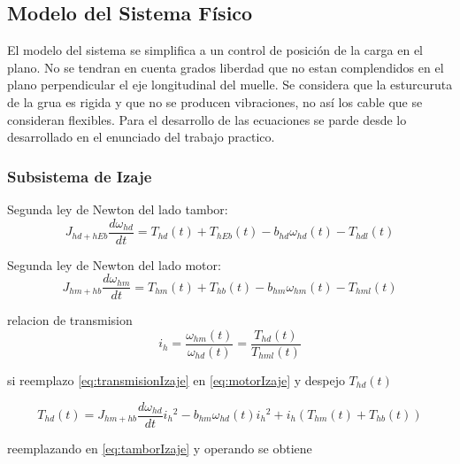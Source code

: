 \documentclass{article}
\begin{document}
    \subsection{Modelo del Sistema Físico} \label{sec:plantModel}

        El modelo del sistema se simplifica a un control de posición de la carga en el plano. No se tendran en cuenta grados liberdad que no estan complendidos en el plano perpendicular el eje longitudinal del muelle. Se considera que la esturcuruta de la grua es rigida y que no se producen vibraciones, no así los cable que se consideran flexibles.
        Para el desarrollo de las ecuaciones se parde desde lo desarrollado en el enunciado del trabajo practico.
        
        \subsubsection{Subsistema de Izaje}
            Segunda ley de Newton del lado tambor:
            \begin{equation} \label{eq:tamborIzaje}
                J_{hd+hEb} \frac{d \omega_{hd}}{dt} = T_{hd}(t) + T_{hEb}(t) - b_{hd} \omega_{hd}(t) - T_{hdl}(t)
            \end{equation}

            Segunda ley de Newton del lado motor:
            \begin{equation} \label{eq:motorIzaje}
                J_{hm+hb} \frac{d \omega_{hm}}{dt} = T_{hm}(t) + T_{hb}(t) - b_{hm} \omega_{hm}(t) - T_{hml}(t)
            \end{equation}

            relacion de transmision
            \begin{equation} \label{eq:transmisionIzaje}
                i_h = \frac{\omega_{hm}(t)}{\omega_{hd}(t)} = \frac{T_{hd}(t)}{T_{hml}(t)}
            \end{equation}

            si reemplazo \ref{eq:transmisionIzaje} en \ref{eq:motorIzaje} y despejo $T_{hd}(t)$

            \begin{equation} \label{eq:Thd}
                T_{hd}(t) = J_{hm+hb} \frac{d \omega_{hd}}{dt} {i_h}^2 - b_{hm} \omega_{hd}(t) {i_h}^2 + i_h (T_{hm}(t) + T_{hb}(t))
            \end{equation}

            reemplazando en \ref{eq:tamborIzaje} y operando se obtiene
\end{document}
